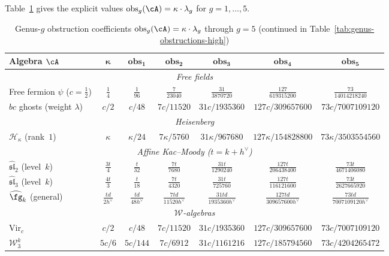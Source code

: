Table~\ref{tab:genus-obstructions} gives the explicit values
$\operatorname{obs}_g(\cA) = \kappa \cdot \lambda_g$ for
$g = 1, \ldots, 5$.

\begin{table}[ht]
\centering
\caption{Genus-$g$ obstruction coefficients $\operatorname{obs}_g(\cA) = \kappa \cdot \lambda_g$ through $g = 5$
(continued in Table~\ref{tab:genus-obstructions-high})}
\label{tab:genus-obstructions}
\renewcommand{\arraystretch}{1.5}
{\footnotesize
\begin{tabular}{|l|c|c|c|c|c|c|}
\hline
\textbf{Algebra $\cA$}
  & $\boldsymbol{\kappa}$
  & $\boldsymbol{\operatorname{obs}_1}$
  & $\boldsymbol{\operatorname{obs}_2}$
  & $\boldsymbol{\operatorname{obs}_3}$
  & $\boldsymbol{\operatorname{obs}_4}$
  & $\boldsymbol{\operatorname{obs}_5}$ \\
\hline
\multicolumn{7}{|c|}{\textit{Free fields}} \\
\hline
Free fermion $\psi$ ($c = \tfrac{1}{2}$)
  & $\tfrac{1}{4}$
  & $\tfrac{1}{96}$
  & $\tfrac{7}{23040}$
  & $\tfrac{31}{3870720}$
  & $\tfrac{127}{619315200}$
  & $\tfrac{73}{14014218240}$ \\
\hline
$bc$ ghosts (weight $\lambda$)
  & $c/2$
  & $c/48$
  & $7c/11520$
  & $31c/1935360$
  & $127c/309657600$
  & $73c/7007109120$ \\
\hline
\multicolumn{7}{|c|}{\textit{Heisenberg}} \\
\hline
$\mathcal{H}_\kappa$ (rank~$1$)
  & $\kappa$
  & $\kappa/24$
  & $7\kappa/5760$
  & $31\kappa/967680$
  & $127\kappa/154828800$
  & $73\kappa/3503554560$ \\
\hline
\multicolumn{7}{|c|}{\textit{Affine Kac--Moody ($t = k + h^\vee$)}} \\
\hline
$\widehat{\mathfrak{sl}}_2$ (level~$k$)
  & $\frac{3t}{4}$
  & $\frac{t}{32}$
  & $\frac{7t}{7680}$
  & $\frac{31t}{1290240}$
  & $\frac{127t}{206438400}$
  & $\frac{73t}{4671406080}$ \\[4pt]
\hline
$\widehat{\mathfrak{sl}}_3$ (level~$k$)
  & $\frac{4t}{3}$
  & $\frac{t}{18}$
  & $\frac{7t}{4320}$
  & $\frac{31t}{725760}$
  & $\frac{127t}{116121600}$
  & $\frac{73t}{2627665920}$ \\[4pt]
\hline
$\widehat{\fg}_k$ (general)
  & $\frac{td}{2h^\vee}$
  & $\frac{td}{48 h^\vee}$
  & $\frac{7td}{11520 h^\vee}$
  & $\frac{31td}{1935360 h^\vee}$
  & $\frac{127td}{309657600 h^\vee}$
  & $\frac{73td}{7007109120 h^\vee}$ \\[4pt]
\hline
\multicolumn{7}{|c|}{\textit{$\mathcal{W}$-algebras}} \\
\hline
$\mathrm{Vir}_c$
  & $c/2$
  & $c/48$
  & $7c/11520$
  & $31c/1935360$
  & $127c/309657600$
  & $73c/7007109120$ \\[4pt]
\hline
$\mathcal{W}_3^k$
  & $5c/6$
  & $5c/144$
  & $7c/6912$
  & $31c/1161216$
  & $127c/185794560$
  & $73c/4204265472$ \\[4pt]
\hline
\end{tabular}
}
\end{table}

